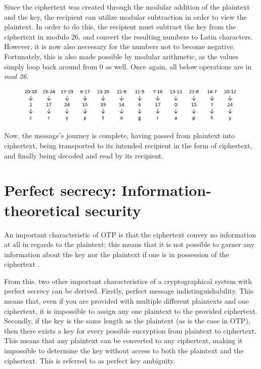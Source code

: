 \documentclass[12pt]{report}
\begin{document}
Since the ciphertext was created through the modular addition of the plaintext and the key, the recipient can utilize modular subtraction in order to view the plaintext. In order to do this, the recipient must subtract the key from the ciphertext in modulo 26, and convert the resulting numbers to Latin characters.  However, it is now also necessary for the numbers not to become negative. Fortunately, this is also made possible by modular arithmetic, as the values simply loop back around from 0 as well. Once again, all below operations are in \textit{mod 26}.

\begin{figure}[H]
\centering
\includegraphics[scale=1]{Table4.PNG}
\end{figure}

Now, the message's journey is complete, having passed from plaintext into ciphertext, being transported to its intended recipient in the form of ciphertext, and finally being decoded and read by its recipient. 

\section{Perfect secrecy: Information-theoretical security}
An important characteristic of OTP is that the ciphertext convey no information at all in regards to the plaintext; this means that it is not possible to garner any information about the key nor the plaintext if one is in possession of the ciphertext \cite{PerfectSecrecy} \cite{HandbookOfAppliedCryptography}.

From this, two other important characteristics of a cryptographical system with perfect secrecy can be derived. Firstly, perfect message indistinguishability. This means that, even if you are provided with multiple different plaintexts and one ciphertext, it is impossible to assign any one plaintext to the provided ciphertext. Secondly, if the key is the same length as the plaintext (as is the case in OTP), then there exists a key for every possible encryption from plaintext to ciphertext. This means that any plaintext can be converted to any ciphertext, making it impossible to determine the key without access to both the plaintext and the ciphertext. This is referred to as perfect key ambiguity.		%
\end{document}
